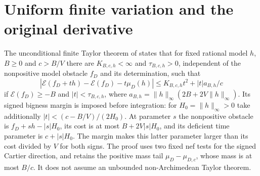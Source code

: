 \documentclass[11pt]{article}
\begin{document}
\section{Uniform finite variation and the original derivative}\label{variation}
The unconditional finite Taylor theorem of \cite[Section 4]{Finite} states that
for fixed rational model $h$, $B\geq0$ and $c>B/V$ there are
$K_{B,c,h}<\infty$ and $\tau_{B,c,h}>0$, independent of the
nonpositive model obstacle $f_D$ and its determination, such that
\[
 |\mathscr E(f_D+th)-\mathscr E(f_D)-t\mu_D(h)|
   \leq K_{B,c,h}t^2+|t|a_{B,h}/c                       \tag{12}
\]
if $\mathscr E(f_D)\geq-B$ and $|t|<\tau_{B,c,h}$, where
$a_{B,h}=\|h\|_\infty(2B+2V\|h\|_\infty)$.
Its signed bigness margin is imposed before integration:
for $H_0=\|h\|_\infty>0$ take additionally
$|t|<(c-B/V)/(2H_0)$.
At parameter $s$ the nonpositive obstacle is
$f_D+sh-|s|H_0$, its cost is at most $B+2V|s|H_0$,
and its deficient time parameter is $c+|s|H_0$.
The margin makes this latter parameter larger than its cost divided
by $V$ for both signs. The proof uses two fixed nef tests for the
signed Cartier direction, and retains the positive mass tail
$\mu_D-\mu_{D,c}$, whose mass is at most $B/c$.
It does not assume an unbounded non-Archimedean Taylor theorem.
\end{document}

